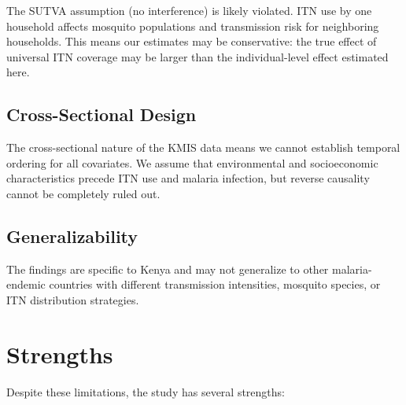 The SUTVA assumption (no interference) is likely violated. ITN use by one household affects mosquito populations and transmission risk for neighboring households. This means our estimates may be conservative: the true effect of universal ITN coverage may be larger than the individual-level effect estimated here.

\subsection{Cross-Sectional Design}

The cross-sectional nature of the KMIS data means we cannot establish temporal ordering for all covariates. We assume that environmental and socioeconomic characteristics precede ITN use and malaria infection, but reverse causality cannot be completely ruled out.

\subsection{Generalizability}

The findings are specific to Kenya and may not generalize to other malaria-endemic countries with different transmission intensities, mosquito species, or ITN distribution strategies.

\section{Strengths}

Despite these limitations, the study has several strengths:

